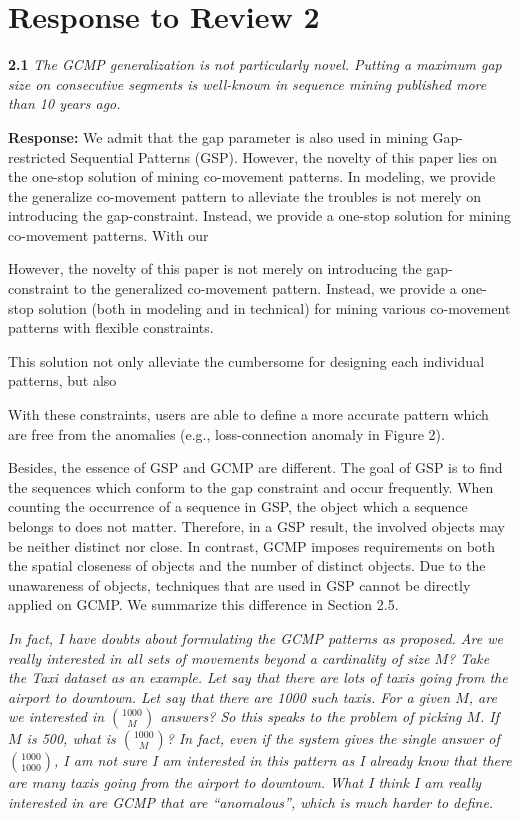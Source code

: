 \section{Response to Review 2}

\textbf{2.1} \emph{The GCMP generalization is not particularly novel. Putting a maximum gap size
on consecutive segments is well-known
in sequence mining published more than
10 years ago.}

\textbf{Response:}
We admit that the gap parameter is also used in
mining Gap-restricted Sequential Patterns (GSP). 
However, the novelty of this paper lies
on the one-stop solution of mining co-movement patterns.
In modeling, we provide the generalize co-movement pattern to
alleviate the troubles
is not merely on introducing the gap-constraint.
Instead, we provide a one-stop solution for mining co-movement patterns. With
our 

However, the novelty
of this paper is not merely on introducing the gap-constraint to the generalized
co-movement pattern. 
Instead, we provide a one-stop solution (both in modeling and in technical)
for mining various co-movement patterns with flexible constraints.
 

This solution not only alleviate the cumbersome for designing each
individual patterns, but also 

 With
these constraints, users are able to define a more accurate pattern
which are free from the anomalies (e.g., loss-connection anomaly in Figure 2).

Besides, the essence of GSP and GCMP are different. The goal of GSP 
is to find the sequences which conform to the gap constraint and occur frequently.
When counting the occurrence of a sequence in GSP, the object
which a sequence belongs to does not matter. Therefore, 
in a GSP result, the involved objects may be neither
 distinct nor close.
In contrast, GCMP imposes requirements on both the spatial closeness 
of objects and the number of distinct objects.
Due to the unawareness of objects, techniques that are used in GSP 
cannot be directly applied on GCMP. We summarize this difference
in Section 2.5.


\emph{In fact, I have doubts about formulating the GCMP patterns as proposed. Are
we really interested in all sets of movements beyond a cardinality of size $M$? 
Take the Taxi dataset as an example. Let say that there are lots of taxis going
from the airport to downtown. Let say that there are 1000 such taxis. For a
given $M$, are we interested in ${1000 \choose M}$ answers? 
So this speaks to the problem of picking $M$. If $M$ is 500, what is ${1000 \choose M}$? In fact, even if the
system gives the single answer of ${1000\choose 1000}$,
I am not sure I am
interested in this pattern as I already know that there are many taxis going from
the airport to downtown. What I think I am really interested in are GCMP that
are ``anomalous'', which is much harder to define.}


